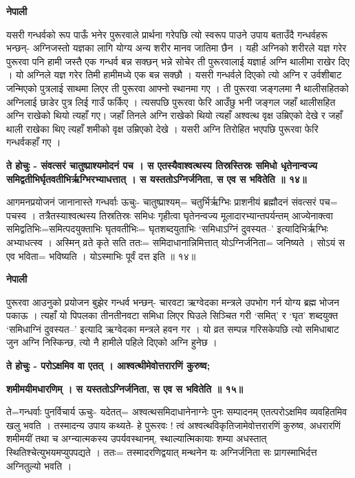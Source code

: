\documentclass[11pt, a5paper]{article}
\begin{document}
\textbf{नेपाली}

यसरी गन्धर्वको रूप पाऊँ भनेर पुरूरवाले प्रार्थना गरेपछि त्यो स्वरूप पाउने उपाय बताउँदै गन्धर्वहरू भन्छन्- अग्निजस्तो यज्ञका लागि योग्य अन्य शरीर मानव जातिमा छैन । यही अग्निको शरीरले यज्ञ गरेर पुरूरवा पनि हामी जस्तै एक गन्धर्व बन्न सक्छन् भन्ने सोचेर ती पुरूरवालाई यज्ञार्ह अग्नि थालीमा राखेर दिए । यो अग्निले यज्ञ गरेर तिमी हामीमध्ये एक बन्न सक्छौ । यसरी गन्धर्वले दिएको त्यो अग्नि र उर्वशीबाट जन्मिएको पुत्रलाई साथमा लिएर ती पुरूरवा आफ्नो स्थानमा गए । ती पुरूरवा जङ्गलमा नै थालीसहितको अग्निलाई  छाडेर पुत्र लिई गाउँ फर्किए । त्यसपछि पुरूरवा फेरि आउँछु भनी जङ्गल जहाँ थालीसहित अग्नि राखेको थियो त्यहाँ गए। जहाँ तिनले अग्नि राखेको थियो त्यहाँ अश्वत्थ वृक्ष उम्रिएको देखे र जहाँ थाली राखेका थिए  त्यहाँ शमीको वृक्ष उम्रिएको देखे । यसरी अग्नि तिरोहित भएपछि पुरूरवा फेरि गन्धर्वकहाँ गए ।

\textbf{ते होचुः - संवत्सरं चातुष्प्राश्यमोदनं पच । स एतस्यैवाश्वत्थस्य तिस्रस्तिस्रः समिधो धृतेनान्वज्य समिद्वतीभिर्घृतवतीभिर्ऋग्भिरभ्याधत्तात् । स यस्ततोऽग्निर्जनिता, स एव स भवितेति ॥ १४॥}

आगमनप्रयोजनं जानानास्ते गन्धर्वाः ऊचुः- चातुष्प्राश्यम्= चतुर्भिर्ऋग्भिः प्राशनीयं ब्रह्मौदनं संवत्सरं पच= पचस्व । तत्रैतस्याश्वत्थस्य तिस्रतिस्रः समिधः गृहीत्वा घृतेनन्वज्य मूलादारभ्यान्तपर्यन्तम् आज्येनाक्त्वा समिद्वतिभिः=समित्पदयुक्ताभिः घृतवतीभिः= घृतशब्दयुताभिः ‘समिधाऽग्निं दुवस्यत–’ इत्यादिभिर्ऋग्भिः अभ्याधत्स्व । अस्मिन् व्रते कृते सति ततः= समिदाधानान्निमित्तात् योऽग्निर्जनिता= जनिष्यते । सोऽयं स एव भविता= भविष्यति । योऽस्माभिः पूर्वं दत्त इति ॥ १४॥

\textbf{नेपाली}

पुरूरवा आउनुको प्रयोजन बुझेर गन्धर्व भन्छन्- चारवटा ऋग्वेदका मन्त्रले उपभोग गर्न योग्य ब्रह्म भोजन पकाऊ । त्यहाँ यो पिपलका तीनतीनवटा समिधा लिएर घिउले सिञ्चित गरी ‘समित्’ र ‘घृत’ शब्दयुक्त ‘समिधाग्निं दुवस्यत–’ इत्यादि ऋग्वेदका मन्त्रले हवन गर । यो व्रत सम्पन्न गरिसकेपछि त्यो समिधाबाट जुन अग्नि निस्किन्छ, त्यो नै हामीले पहिले दिएको अग्नि हुनेछ ।

\textbf{ते होचुः - परोऽक्षमिव वा एतत् । आश्वत्थीमेवोत्तरारणिं कुरुष्व;}

\textbf{शमीमयीमधारणिम् । स यस्ततोऽग्निर्जनिता, स एव स भवितेति ॥ १५॥}

ते=गन्धर्वाः पुनर्विचार्य ऊचुः- यदेतत्= अश्वत्थसमिदाधानेनाग्नेः पुनः सम्पादनम् एतत्परोऽक्षमिव व्यवहितमिव खलु भवति । तस्मादन्य उपाय कथ्यते- हे पुरूरवः ! त्वं अश्वत्थविकृतिजामेवोत्तरारणिं कुरुष्व, अधरारणिं शमीमयीं तथा च अग्न्यात्मकस्य उपर्यवस्थानम्, स्थाल्यात्मिकायाः शम्या अधस्तात् स्थितिश्चेत्युभयमप्युपपद्यते । ततः= तस्मादरणिद्वयात् मन्थनेन यः अग्निर्जनिता सः प्रागस्माभिर्दत्त अग्नितुल्यो भवति ।
\end{document}
